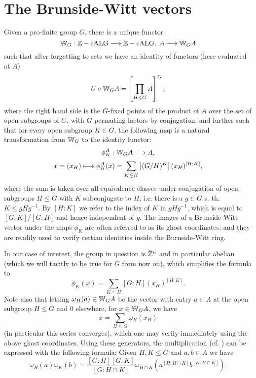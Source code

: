 \section{The Brunside-Witt vectors}
\begin{thm}\cite{dress1988burnside}
Given a pro-finite group $G$, there is a unique functor
  \[	\mathbb{W}_G: \mathbb{Z}-\mathrm{cALG} \longrightarrow \mathbb{Z}-\mathrm{cALG},\; A \longmapsto \mathbb{W}_G A	\]
such that after forgetting to sets we have an identity of functors (here evaluated at $A$)
  \[	U \circ \mathbb{W}_G A = \left [ \prod_{H \leq G} A \right ]^G,	\]
where the right hand side is the $G$-fixed points of the product of $A$ over the set of open subgroups of $G$, with $G$ permuting factors by conjugation, and further such that for every open subgroup $K \in G$, the following map is a natural transformation from $\mathbb{W}_G$ to the identity functor:
  \[	\phi^A_K: \mathbb{W}_G A \longrightarrow A,\]
  \[	x = (x_H) \longmapsto \phi^A_K(x) = \sum_{K \lesssim H} \left\vert(G/H)^K\right\vert(x_H)^{[H:K]},	\]
where the sum is taken over all equivalence classes under conjugation of open subgroups $H \leq G$ with $K$ subconjugate to $H$, i.e. there is a $g \in G$ s. th. $K \leq gHg^{-1}$. By $[H:K]$ we refer to the index of $K$ in $gHg^{-1}$, which is equal to $[G:K]/[G:H]$ and hence independent of $g$. The images of a Brunside-Witt vector under the maps $\phi_K$ are often referred to as its ghost coordinates, and they are readily used to verify certian identities inside the Burnside-Witt ring.
\end{thm}
%
%
\begin{rem}\label{rem_witt_ghost_generators_multiplication}
In our case of interest, the group in question is $\hat{\mathbb{Z}}^n$ and in particular abelian (which we will tacitly to be true for $G$ from now on), which simplifies the formula to
\begin{equation}\label{eq_witt_ghost_coordinates}
	\phi_K(x) = \sum_{K \leq H} [G:H](x_H)^{[H:K]}.
\end{equation}
Note also that letting $\omega_H(a) \in \mathbb{W}_G A$ be the vector with entry $a \in A$ at the open subgroup $H \leq G$ and $0$ elsewhere, for $x \in \mathbb{W}_G A$, we have
\begin{equation}\label{eq_witt_sum}
	x = \sum_{H \leq G} \omega_H(x_H)
\end{equation}
(in particular this series converges), which one may verify immediately using the above ghost coordinates. Using these generators, the multiplication (cf. \cite[Rem. 4.6]{elliott2006constructing}) can be expressed with the following formula: Given $H,K \leq G$ and $a,b \in A$ we have
\begin{equation}\label{eq_witt_multiplication}
	\omega_H (a) \omega_K (b) = \frac{[G:H][G:K]}{[G : H \cap K]} \omega_{H \cap K}%
		(a^{ [H : H \cap K] } b^{ [K : H \cap K] }).
\end{equation}
\end{rem}
